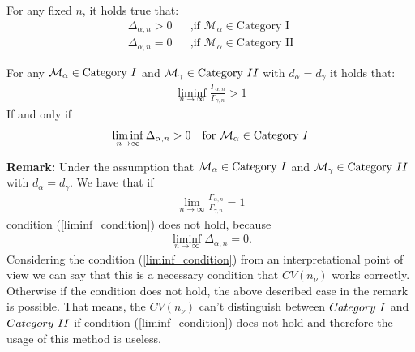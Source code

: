 \documentclass[Research_Module_ES.tex]{subfiles}
\begin{document}
\begin{lemma}
	\label{Equation2.3-2.4}
	For any fixed $n$, it holds true that:
	\begin{align*}
		&&\Delta_{\alpha,n}>0 &&\text{,if } \mathcal{M}_\alpha\in\text{Category I}&&\\
		&&\Delta_{\alpha,n}=0 &&\text{,if } \mathcal{M}_\alpha\in\text{Category II}&&
	\end{align*}
\end{lemma}


\begin{lemma}
	\label{Equation2.5}
	For any $\mathcal{M}_\alpha\in\text{Category}~\RM{1}$ and $\mathcal{M}_\gamma\in\text{Category}~\RM{2}$ with $d_\alpha=d_\gamma$ it holds that:
	\begin{align*}
	\liminf_{n\rightarrow\infty}\frac{\Gamma_{\alpha,n}}{\Gamma_{\gamma,n}}>1
	\end{align*}
	If and only if
	\begin{align}
	\liminf_{n\rightarrow\infty}\Delta_{\alpha,n}>0 \text{~~~for~}\mathcal{M}_\alpha\in\text{Category}~\RM{1} \label{liminf_condition}
	\end{align}
\end{lemma}

\textbf{Remark:}
	Under the assumption that $\mathcal{M}_\alpha\in\text{Category}~\RM{1}$ and $\mathcal{M}_\gamma\in\text{Category}~\RM{2}$ with $d_\alpha=d_\gamma$. We have that if
	\begin{align*}
		\lim_{n\rightarrow\infty}\frac{\Gamma_{\alpha,n}}{\Gamma_{\gamma,n}}=1
	\end{align*} 
	condition (\ref{liminf_condition}) does not hold, because
	\begin{align*}
	\liminf_{n\rightarrow\infty}\Delta_{\alpha,n}=0.
	\end{align*}
Considering the condition (\ref{liminf_condition}) from an interpretational point of view we can say that
this is a necessary condition that $CV(n_\nu)$ works correctly. Otherwise if the condition does not hold, the above described case in the remark is possible. That means, the $CV(n_\nu)$ can't distinguish between $Category~\RM{1}$ and $Category~\RM{2}$ if condition (\ref{liminf_condition}) does not hold and therefore the usage of this method is useless.
\end{document}
